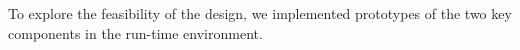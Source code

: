 To explore the feasibility of the \flux design, we implemented prototypes
of the two key components in the \flux run-time environment. 
%


